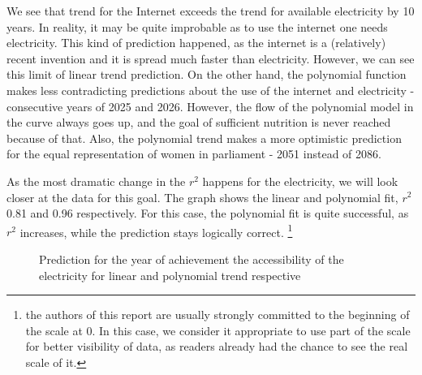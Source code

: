 \documentclass[reprint, onecolumn, amsmath, amssymb, showpacs, superscriptaddress, aps, prl]{revtex4-2}
\begin{document}
We see that trend for the Internet exceeds the trend for available electricity by 10 years. In reality, it may be quite improbable as to use the internet one needs electricity. This kind of prediction happened, as the internet is a (relatively) recent invention and it is spread much faster than electricity. However, we can see this limit of linear trend prediction. 
On the other hand, the polynomial function makes less contradicting predictions about the use of the internet and electricity - consecutive years of 2025 and 2026. However, the flow of the polynomial model in the curve always goes up, and the goal of sufficient nutrition is never reached because of that. Also, the polynomial trend makes a more optimistic prediction for the equal representation of women in parliament - 2051 instead of 2086. 



As the most dramatic change in the \(r^2\) happens for the electricity, we will look closer at the data for this goal. The graph shows the linear and polynomial fit, \(r^2\) 0.81 and 0.96 respectively. For this case, the polynomial fit is quite successful, as \(r^2\) increases, while the prediction stays logically correct.  \footnote{the authors of this report are usually strongly committed to the beginning of the scale at 0. In this case, we consider it appropriate to use part of the scale for better visibility of data, as readers already had the chance to see the real scale of it.}

\begin{figure}[h!]%
    \centering
    \qquad
    \caption{Prediction for the year of achievement the accessibility of the electricity for linear and polynomial trend respective}%
    \label{fig:example}%
\end{figure}
\end{document}
